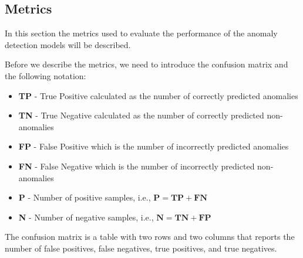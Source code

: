\documentclass[a4paper, twoside]{report}
\theoremstyle{definition}
\numberwithin{equation}{section}
\begin{document}
\subsection{Metrics} \label{sec:metrics}


In this section the metrics used to evaluate the performance of the anomaly detection models will be described.

Before we describe the metrics, we need to introduce the confusion matrix and
the following notation:
\begin{itemize}
    \item \textbf{TP} - True Positive calculated as the number of correctly predicted anomalies
    \item \textbf{TN} - True Negative calculated as the number of correctly predicted non-anomalies
    \item \textbf{FP} - False Positive which is the number of incorrectly predicted anomalies
    \item \textbf{FN} - False Negative which is the number of incorrectly predicted non-anomalies
    \item \textbf{P} - Number of positive samples, i.e., $\textbf{P}=\textbf{TP}+\textbf{FN}$
    \item \textbf{N} - Number of negative samples, i.e., $\textbf{N}=\textbf{TN}+\textbf{FP}$
\end{itemize}

The confusion matrix is a table with two rows and two columns that reports the number of false positives, false negatives, true positives, and true negatives.
\end{document}
